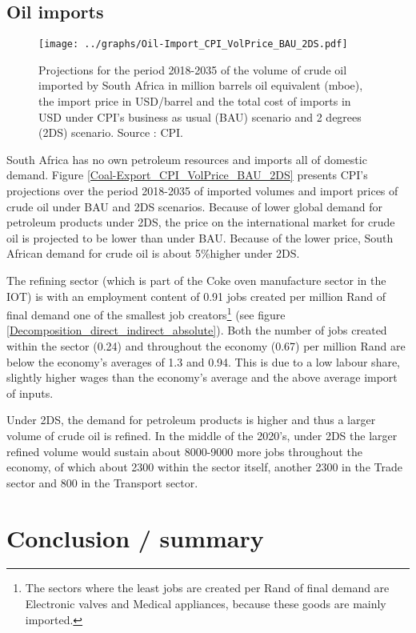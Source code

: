 \documentclass[12pt,english]{article}
\begin{document}
\subsection{Oil imports}

\begin{figure}[!t]
	\centering
	\texttt{[image: ../graphs/Oil-Import\_CPI\_VolPrice\_BAU\_2DS.pdf]}
	\caption{\label{Oil-Import_CPI_VolPrice_BAU_2DS}\small Projections for the period 2018-2035 of the volume of crude oil imported by South Africa in million barrels oil equivalent (mboe), the import price in USD/barrel and the total cost of imports in USD under CPI's business as usual (BAU) scenario and 2 degrees (2DS) scenario. Source : CPI.}
\end{figure}

South Africa has no own petroleum resources and imports all of domestic demand. Figure \ref{Coal-Export_CPI_VolPrice_BAU_2DS} presents CPI's projections over the period 2018-2035 of imported volumes and import prices of crude oil under BAU and 2DS scenarios. Because of lower global demand for petroleum products under 2DS, the price on the international market for crude oil is projected to be lower than under BAU. Because of the lower price, South African demand for crude oil is about 5\%higher under 2DS. 

The refining sector (which is part of the Coke oven manufacture sector in the IOT) is with an employment content of 0.91 jobs created per million Rand of final demand one of the smallest job creators\footnote{The sectors where the least jobs are created per Rand of final demand are Electronic valves and Medical appliances, because these goods are mainly imported.} (see figure \ref{Decomposition_direct_indirect_absolute}). Both the number of jobs created within the sector (0.24) and throughout the economy (0.67) per million Rand are below the economy's averages of 1.3 and 0.94. This is due to a low labour share, slightly higher wages than the economy's average and the above average import of inputs. 

Under 2DS, the demand for petroleum products is higher and thus a larger volume of crude oil is refined. In the middle of the 2020's, under 2DS the larger refined volume would sustain about 8000-9000 more jobs throughout the economy, of which about 2300 within the sector itself, another 2300 in the Trade sector and 800 in the Transport sector.



\section{Conclusion / summary} \label{conclusion}
\end{document}
